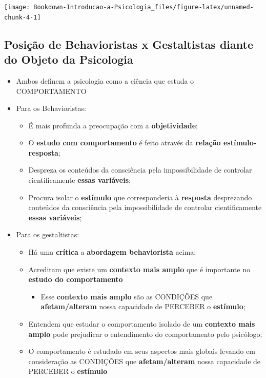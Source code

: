 \documentclass[
]{book}
\providecommand{\tightlist}{%
  \setlength{\itemsep}{0pt}\setlength{\parskip}{0pt}}
\begin{document}
\texttt{[image: Bookdown-Introducao-a-Psicologia\_files/figure-latex/unnamed-chunk-4-1]}

\hypertarget{posiuxe7uxe3o-de-behavioristas-x-gestaltistas-diante-do-objeto-da-psicologia}{%
\subsection{Posição de Behavioristas x Gestaltistas diante do Objeto da Psicologia}\label{posiuxe7uxe3o-de-behavioristas-x-gestaltistas-diante-do-objeto-da-psicologia}}

\begin{itemize}
\tightlist
\item
  Ambos definem a psicologia como a ciência que estuda o COMPORTAMENTO
\item
  Para os Behavioristas:

  \begin{itemize}
  \tightlist
  \item
    É mais profunda a preocupação com a \textbf{objetividade};
  \item
    O \textbf{estudo com comportamento} é feito através da \textbf{relação estímulo-resposta};
  \item
    Despreza os conteúdos da consciência pela impossibilidade de controlar cientificamente \textbf{essas variáveis};
  \item
    Procura isolar o \textbf{estímulo} que corresponderia à \textbf{resposta} desprezando conteúdos da consciência pela impossibilidade de controlar cientificamente \textbf{essas variáveis};
  \end{itemize}
\item
  Para os gestaltistas:

  \begin{itemize}
  \tightlist
  \item
    Há uma \textbf{crítica} a \textbf{abordagem behaviorista} acima;
  \item
    Acreditam que existe um \textbf{contexto mais amplo} que é importante no \textbf{estudo do comportamento}

    \begin{itemize}
    \tightlist
    \item
      Esse \textbf{contexto mais amplo} são as CONDIÇÕES que \textbf{afetam/alteram} nossa capacidade de PERCEBER o \textbf{estímulo};
    \end{itemize}
  \item
    Entendem que estudar o comportamento isolado de um \textbf{contexto mais amplo} pode prejudicar o entendimento do comportamento pelo psicólogo;
  \item
    O comportamento é estudado em seus aspectos mais globais levando em consideração as CONDIÇÕES que \textbf{afetam/alteram} nossa capacidade de PERCEBER o \textbf{estímulo}
  \end{itemize}
\end{itemize}
\end{document}
